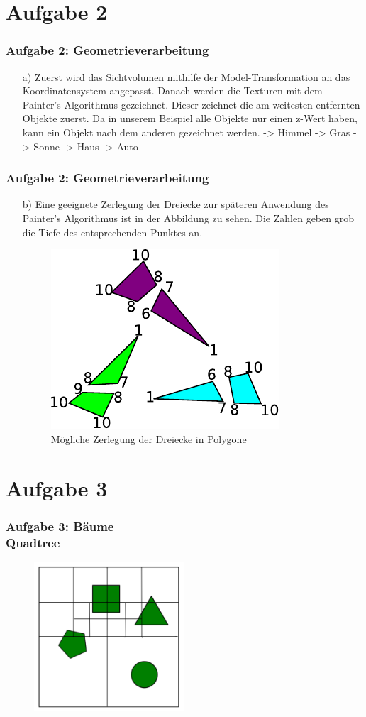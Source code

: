 \documentclass[accentcolor=tud9c,colorbacktitle,inverttitle,landscape,german,presentation,t]{tudbeamer}
\begin{document}
\section{Aufgabe 2}
	\begin{frame}
		\frametitle{Aufgabe 2: Geometrieverarbeitung}
		\begin{itemize}
		\item[a)] Zuerst wird das Sichtvolumen mithilfe der Model-Transformation an das Koordinatensystem angepasst. Danach werden die Texturen mit dem Painter's-Algorithmus gezeichnet. Dieser zeichnet die am weitesten entfernten Objekte zuerst. Da in unserem Beispiel alle Objekte nur einen z-Wert haben, kann ein Objekt nach dem anderen gezeichnet werden. -> Himmel -> Gras -> Sonne -> Haus -> Auto
		\end{itemize}
	\end{frame}
	\begin{frame}
	\frametitle{Aufgabe 2: Geometrieverarbeitung} 
	\begin{itemize}
		\item[b)]
		Eine geeignete Zerlegung der Dreiecke zur späteren Anwendung des Painter's Algorithmus ist in der Abbildung zu sehen. Die Zahlen geben grob die Tiefe des entsprechenden Punktes an.
		\begin{figure}
			\includegraphics[width = .45\linewidth]{painters.pdf}
			\caption{Mögliche Zerlegung der Dreiecke in Polygone}
			\label{painters}
		\end{figure}
	\end{itemize}
\end{frame}
	
\section{Aufgabe 3}
\begin{frame}
	\frametitle{Aufgabe 3: B\"aume \\Quadtree} 
	\begin{figure}
		\centering
		\includegraphics[width=0.5\textwidth]{Quadtree}
	\end{figure}
\end{frame}
\end{document}
